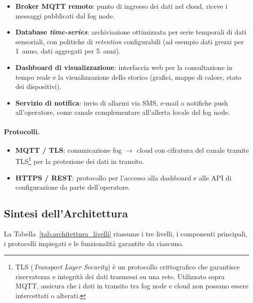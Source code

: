\begin{itemize}
	\item \textbf{Broker MQTT remoto}: punto di ingresso dei dati nel cloud, riceve i messaggi pubblicati dal fog node.
	\item \textbf{Database \textit{time-series}}: archiviazione ottimizzata per serie temporali di dati sensoriali, con politiche di \textit{retention} configurabili (ad esempio dati grezzi per 1~anno, dati aggregati per 5~anni).
	\item \textbf{Dashboard di visualizzazione}: interfaccia web per la consultazione in tempo reale e la visualizzazione dello storico (grafici, mappe di calore, stato dei dispositivi).
	\item \textbf{Servizio di notifica}: invio di allarmi via SMS, e-mail o notifiche push all'operatore, come canale complementare all'allerta locale del fog node.
\end{itemize}

\paragraph{Protocolli.}

\begin{itemize}
	\item \textbf{MQTT / TLS}: comunicazione fog $\rightarrow$ cloud con cifratura del canale tramite TLS\footnote{TLS (\textit{Transport Layer Security}) è un protocollo crittografico che garantisce riservatezza e integrità dei dati trasmessi su una rete. Utilizzato sopra MQTT, assicura che i dati in transito tra fog node e cloud non possano essere intercettati o alterati.} per la protezione dei dati in transito.
	\item \textbf{HTTPS / REST}: protocollo per l'accesso alla dashboard e alle API di configurazione da parte dell'operatore.
\end{itemize}


\subsection{Sintesi dell'Architettura}

La Tabella~\ref{tab:architettura_livelli} riassume i tre livelli, i componenti principali, i protocolli impiegati e le funzionalità garantite da ciascuno.

